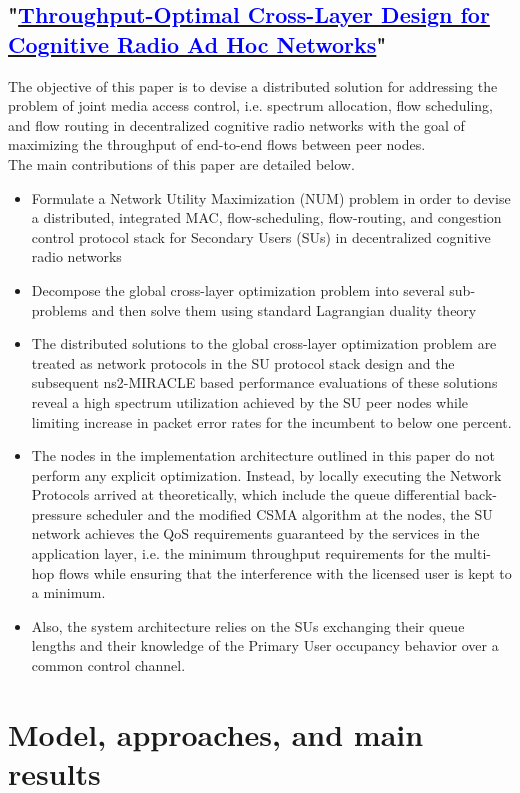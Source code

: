 \documentclass[12pt, draftcls, onecolumn]{IEEEtran}
\begin{document}
\subsection{"\href{http://ieeexplore.ieee.org/stamp/stamp.jsp?tp=&arnumber=6881740&isnumber=7180482}{\textcolor{blue}{Throughput-Optimal Cross-Layer Design for Cognitive Radio Ad Hoc Networks}}"}
The objective of this paper is to devise a distributed solution for addressing the problem of joint media access control, i.e. spectrum allocation, flow scheduling, and flow routing in decentralized cognitive radio networks with the goal of maximizing the throughput of end-to-end flows between peer nodes.
\\The main contributions of this paper are detailed below.
\begin{itemize}
    \item Formulate a Network Utility Maximization (NUM) problem in order to devise a distributed, integrated MAC, flow-scheduling, flow-routing, and congestion control protocol stack for Secondary Users (SUs) in decentralized cognitive radio networks
    \item Decompose the global cross-layer optimization problem into several sub-problems and then solve them using standard Lagrangian duality theory
    \item The distributed solutions to the global cross-layer optimization problem are treated as network protocols in the SU protocol stack design and the subsequent ns2-MIRACLE based performance evaluations of these solutions reveal a high spectrum utilization achieved by the SU peer nodes while limiting increase in packet error rates for the incumbent to below one percent.
    \item The nodes in the implementation architecture outlined in this paper do not perform any explicit optimization. Instead, by locally executing the Network Protocols arrived at theoretically, which include the queue differential back-pressure scheduler and the modified CSMA algorithm at the nodes, the SU network achieves the QoS requirements guaranteed by the services in the application layer, i.e. the minimum throughput requirements for the multi-hop flows while ensuring that the interference with the licensed user is kept to a minimum.
    \item Also, the system architecture relies on the SUs exchanging their queue lengths and their knowledge of the Primary User occupancy behavior over a common control channel.
\end{itemize}
\clearpage
\section{Model, approaches, and main results}
\end{document}
